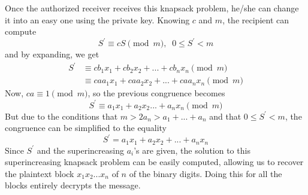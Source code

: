 \documentclass{article}
\theoremstyle{remark}
\theoremstyle{definition}
\begin{document}
Once the authorized receiver receives this knapsack problem, he/she can change it into an easy one using the private key. Knowing $c$ and $m$, the recipient can compute 
\[S^\prime \equiv c S \pmod{m}, \;\; 0 \leq S^\prime < m\]
and by expanding, we get
\begin{align*}
    S^\prime & \equiv c b_1 x_1 + c b_2 x_2 + ... + c b_n x_n \pmod{m} \\
    & \equiv c a a_1 x_1 + c a a_2 x_2 + ... + c a a_n x_n \pmod{m}
\end{align*}
Now, $ca \equiv 1 \pmod{m}$, so the previous congruence becomes 
\[S^\prime \equiv a_1 x_1 + a_2 x_2... + a_n x_n \pmod{m}\]
But due to the conditions that $m > 2a_n > a_1 + ... + a_n$ and that $0 \leq S^\prime < m$, the congruence can be simplified to the equality 
\[S^\prime = a_1 x_1 + a_2 x_2 + ... + a_n x_n\]
Since $S^\prime$ and the superincreasing $a_i$'s are given, the solution to this superincreasing knapsack problem can be easily computed, allowing us to recover the plaintext block $x_1 x_2 ... x_n$ of $n$ of the binary digits. Doing this for all the blocks entirely decrypts the message. 
\end{document}
